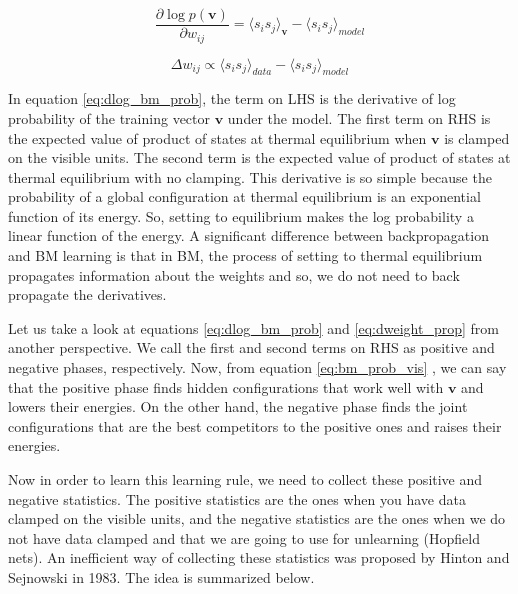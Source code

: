 \documentclass{article}
\begin{document}
\begin{equation}
\frac{\partial \log p(\mathbf{v})}{\partial w_{ij}} = \langle s_i s_j \rangle_\mathbf{v} -  \langle s_i s_j \rangle_{model}
\label{eq:dlog_bm_prob}
\end{equation}

\begin{equation}
\Delta w_{ij} \propto \langle s_i s_j \rangle_{data} -  \langle s_i s_j \rangle_{model}
\label{eq:dweight_prop}
\end{equation}

In equation \ref{eq:dlog_bm_prob}, the term on LHS is the derivative of log probability of the training vector $\mathbf{v}$ under the model. The first term on RHS is the expected value of product of states at thermal equilibrium when $\mathbf{v}$ is clamped on the visible units. The second term is the expected value of product of states at thermal equilibrium with no clamping. This derivative is so simple because the probability of a global configuration at thermal equilibrium is an exponential function of its energy. So, setting to equilibrium makes the log probability a linear function of the energy. A significant difference between backpropagation and BM learning is that in BM, the process of setting to thermal equilibrium propagates information about the weights and so, we do not need to back propagate the derivatives. 

Let us take a look at equations \ref{eq:dlog_bm_prob} and \ref{eq:dweight_prop} from another perspective. We call the first and second terms on RHS as positive and negative phases, respectively. Now, from equation \ref{eq:bm_prob_vis} , we can say that the positive phase finds hidden configurations that work well with $\mathbf{v}$ and lowers their energies. On the other hand, the negative phase finds the joint configurations that are the best competitors to the positive ones and raises their energies.

Now in order to learn this learning rule, we need to collect these positive and negative statistics. The positive statistics are the ones when you have data clamped on the visible units, and the negative statistics are the ones when we do not have data clamped and that we are going to use for unlearning (Hopfield nets). An inefficient way of collecting these statistics was proposed by Hinton and Sejnowski in 1983. The idea is summarized below. 
\end{document}
